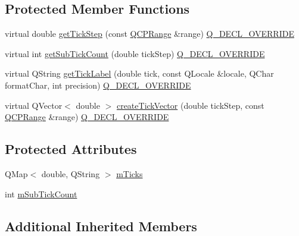 \subsection*{Protected Member Functions}
\begin{DoxyCompactItemize}
\item 
virtual double \mbox{\hyperlink{class_q_c_p_axis_ticker_text_a628f16c41905e8c95c6622d6757a38c4}{get\+Tick\+Step}} (const \mbox{\hyperlink{class_q_c_p_range}{Q\+C\+P\+Range}} \&range) \mbox{\hyperlink{qcustomplot_8h_a42cc5eaeb25b85f8b52d2a4b94c56f55}{Q\+\_\+\+D\+E\+C\+L\+\_\+\+O\+V\+E\+R\+R\+I\+DE}}
\item 
virtual int \mbox{\hyperlink{class_q_c_p_axis_ticker_text_a9c2488b877776870239abda4c8106052}{get\+Sub\+Tick\+Count}} (double tick\+Step) \mbox{\hyperlink{qcustomplot_8h_a42cc5eaeb25b85f8b52d2a4b94c56f55}{Q\+\_\+\+D\+E\+C\+L\+\_\+\+O\+V\+E\+R\+R\+I\+DE}}
\item 
virtual Q\+String \mbox{\hyperlink{class_q_c_p_axis_ticker_text_a99247779a9c20bea1f50911117540a71}{get\+Tick\+Label}} (double tick, const Q\+Locale \&locale, Q\+Char format\+Char, int precision) \mbox{\hyperlink{qcustomplot_8h_a42cc5eaeb25b85f8b52d2a4b94c56f55}{Q\+\_\+\+D\+E\+C\+L\+\_\+\+O\+V\+E\+R\+R\+I\+DE}}
\item 
virtual Q\+Vector$<$ double $>$ \mbox{\hyperlink{class_q_c_p_axis_ticker_text_aa195c4fd0364d0393f1798fb495d6a60}{create\+Tick\+Vector}} (double tick\+Step, const \mbox{\hyperlink{class_q_c_p_range}{Q\+C\+P\+Range}} \&range) \mbox{\hyperlink{qcustomplot_8h_a42cc5eaeb25b85f8b52d2a4b94c56f55}{Q\+\_\+\+D\+E\+C\+L\+\_\+\+O\+V\+E\+R\+R\+I\+DE}}
\end{DoxyCompactItemize}
\subsection*{Protected Attributes}
\begin{DoxyCompactItemize}
\item 
Q\+Map$<$ double, Q\+String $>$ \mbox{\hyperlink{class_q_c_p_axis_ticker_text_a27c48539feb6c293979cd8059ba220c3}{m\+Ticks}}
\item 
int \mbox{\hyperlink{class_q_c_p_axis_ticker_text_a206d092b1598eecb981bba7fb16ff44e}{m\+Sub\+Tick\+Count}}
\end{DoxyCompactItemize}
\subsection*{Additional Inherited Members}


